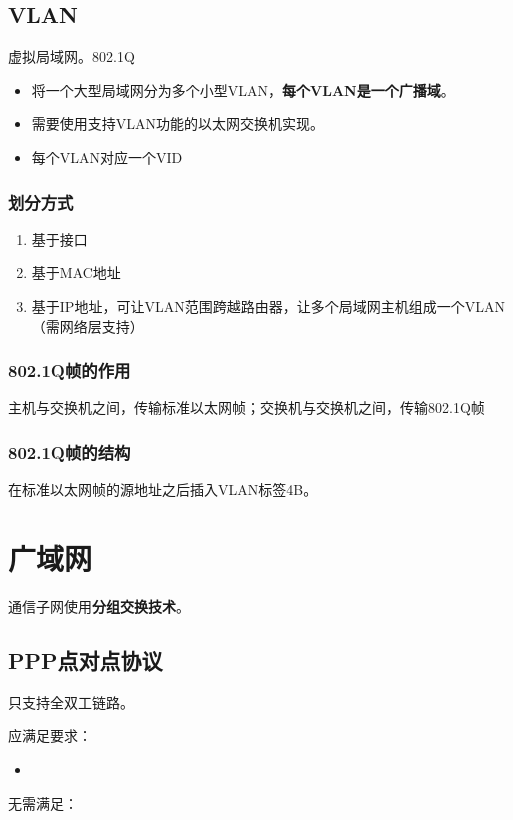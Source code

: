 \subsection{VLAN}
虚拟局域网。802.1Q
\begin{itemize}
    \item 将一个大型局域网分为多个小型VLAN，\textbf{每个VLAN是一个广播域}。
    \item 需要使用支持VLAN功能的以太网交换机实现。
    \item 每个VLAN对应一个VID
\end{itemize}

\subsubsection{划分方式}
\begin{enumerate}
    \item 基于接口
    \item 基于MAC地址
    \item 基于IP地址，可让VLAN范围跨越路由器，让多个局域网主机组成一个VLAN（需网络层支持）
\end{enumerate}


\subsubsection{802.1Q帧的作用}
主机与交换机之间，传输标准以太网帧；交换机与交换机之间，传输802.1Q帧


\subsubsection{802.1Q帧的结构}
在标准以太网帧的源地址之后插入VLAN标签4B。


\section{广域网}

通信子网使用\textbf{分组交换技术}。

\subsection{PPP点对点协议}
只支持全双工链路。

应满足要求：\begin{itemize}
    \item 
\end{itemize}

无需满足：

